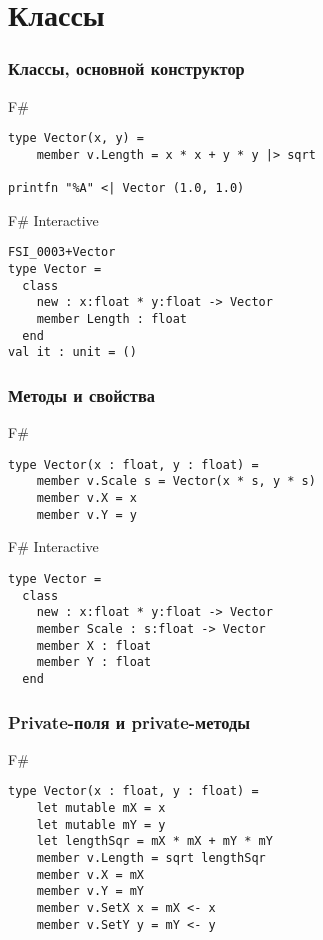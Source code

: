 \documentclass[xetex,mathserif,serif]{beamer}
\begin{document}
    \section{Классы}
    
   	\begin{frame}[fragile]
   		\frametitle{Классы, основной конструктор}
   		\begin{exampleblock}{F\#}
   			\begin{lstlisting}
type Vector(x, y) = 
    member v.Length = x * x + y * y |> sqrt

printfn "%A" <| Vector (1.0, 1.0)
\end{lstlisting}
\end{exampleblock}

		\begin{alertblock}{F\# Interactive}
			\begin{lstlisting}
FSI_0003+Vector
type Vector =
  class
    new : x:float * y:float -> Vector
    member Length : float
  end
val it : unit = ()
\end{lstlisting}
\end{alertblock}
\end{frame}

   	\begin{frame}[fragile]
   		\frametitle{Методы и свойства}
   		\begin{exampleblock}{F\#}
   			\begin{lstlisting}
type Vector(x : float, y : float) = 
    member v.Scale s = Vector(x * s, y * s)
    member v.X = x
    member v.Y = y
\end{lstlisting}
\end{exampleblock}

		\begin{alertblock}{F\# Interactive}
			\begin{lstlisting}
type Vector =
  class
    new : x:float * y:float -> Vector
    member Scale : s:float -> Vector
    member X : float
    member Y : float
  end
\end{lstlisting}
\end{alertblock}
\end{frame}

   	\begin{frame}[fragile]
   		\frametitle{Private-поля и private-методы}
   		\begin{exampleblock}{F\#}
   			\begin{lstlisting}
type Vector(x : float, y : float) = 
    let mutable mX = x
    let mutable mY = y
    let lengthSqr = mX * mX + mY * mY
    member v.Length = sqrt lengthSqr
    member v.X = mX
    member v.Y = mY
    member v.SetX x = mX <- x
    member v.SetY y = mY <- y
\end{lstlisting}
\end{exampleblock}
\end{frame}
\end{document}
